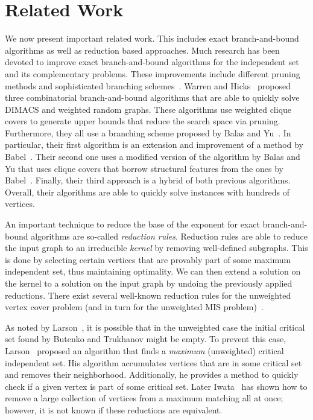 \documentclass[twoside,leqno,twocolumn]{article}
\begin{document}
\section{Related Work}
\label{sec:related_work}
We now present important related work.
This includes exact branch-and-bound algorithms as well as reduction based approaches. Much research has been devoted to improve exact branch-and-bound algorithms for the independent set and its complementary problems.
These improvements include different pruning methods and sophisticated branching schemes~\cite{ostergaard2002fast,balas1986finding,babel1994fast,warren2006combinatorial}.
Warren and Hicks~\cite{warren2006combinatorial} proposed three combinatorial branch-and-bound algorithms that are able to quickly solve DIMACS and weighted random graphs.
These algorithms use weighted clique covers to generate upper bounds that reduce the search space via pruning.
Furthermore, they all use a branching scheme proposed by Balas and Yu~\cite{balas1986finding}.
In particular, their first algorithm is an extension and improvement of a method by Babel~\cite{babel1994fast}.
Their second one uses a modified version of the algorithm by Balas and Yu that uses clique covers that borrow structural features from the ones by Babel~\cite{babel1994fast}.
Finally, their third approach is a hybrid of both previous algorithms.
Overall, their algorithms are able to quickly solve instances with hundreds of vertices.

An important technique to reduce the base of the exponent for exact branch-and-bound algorithms are so-called \emph{reduction rules}.
Reduction rules are able to reduce the input graph to an irreducible \emph{kernel} by removing well-defined subgraphs.
This is done by selecting certain vertices that are provably part of some maximum independent set, thus maintaining optimality.
We can then extend a solution on the kernel to a solution on the input graph by undoing the previously applied reductions.
There exist several well-known reduction rules for the unweighted vertex cover problem (and in turn for the unweighted MIS problem)~\cite{akiba-tcs-2016}.

As noted by Larson~\cite{larson-2007}, it is possible that in the unweighted case the initial critical set found by Butenko and Trukhanov might be empty.
To prevent this case, Larson~\cite{larson-2007} proposed an algorithm that finds a \emph{maximum} (unweighted) critical independent set.
His algorithm accumulates vertices that are in some critical set and removes their neighborhood.
Additionally, he provides a method to quickly check if a given vertex is part of some critical set.
Later Iwata~\cite{iwata-2014} has shown how to remove a large collection of vertices from a maximum matching all at once; however, it is not known if these reductions are equivalent.
\end{document}
